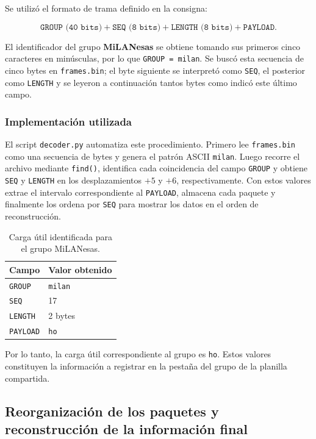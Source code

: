 \documentclass[12pt,a4paper]{article}
\begin{document}
Se utilizó el formato de trama definido en la consigna:

\[
\texttt{GROUP (40 bits)} + \texttt{SEQ (8 bits)} + \texttt{LENGTH (8 bits)} + \texttt{PAYLOAD}.
\]

El identificador del grupo \textbf{MiLANesas} se obtiene tomando sus primeros
cinco caracteres en minúsculas, por lo que \texttt{GROUP = milan}. Se buscó esta
secuencia de cinco bytes en \texttt{frames.bin}; el byte siguiente se interpretó
como \texttt{SEQ}, el posterior como \texttt{LENGTH} y se leyeron a continuación
tantos bytes como indicó este último campo.

\subsubsection*{Implementación utilizada}

El script \texttt{decoder.py} automatiza este procedimiento. Primero lee
\texttt{frames.bin} como una secuencia de bytes y genera el patrón ASCII
\texttt{milan}. Luego recorre el archivo mediante \texttt{find()}, identifica
cada coincidencia del campo \texttt{GROUP} y obtiene \texttt{SEQ} y
\texttt{LENGTH} en los desplazamientos $+5$ y $+6$, respectivamente. Con estos
valores extrae el intervalo correspondiente al \texttt{PAYLOAD}, almacena cada
paquete y finalmente los ordena por \texttt{SEQ} para mostrar los datos en el
orden de reconstrucción.

\begin{table}[H]
\centering
\begin{tabular}{ll}
\toprule
\textbf{Campo} & \textbf{Valor obtenido} \\
\midrule
\texttt{GROUP} & \texttt{milan} \\
\texttt{SEQ} & 17 \\
\texttt{LENGTH} & 2 bytes \\
\texttt{PAYLOAD} & \texttt{ho} \\
\bottomrule
\end{tabular}
\caption{Carga útil identificada para el grupo MiLANesas.}
\end{table}

Por lo tanto, la carga útil correspondiente al grupo es \texttt{ho}. Estos
valores constituyen la información a registrar en la pestaña del grupo de la
planilla compartida.

\subsection{Reorganización de los paquetes y reconstrucción de la información final}
\end{document}
